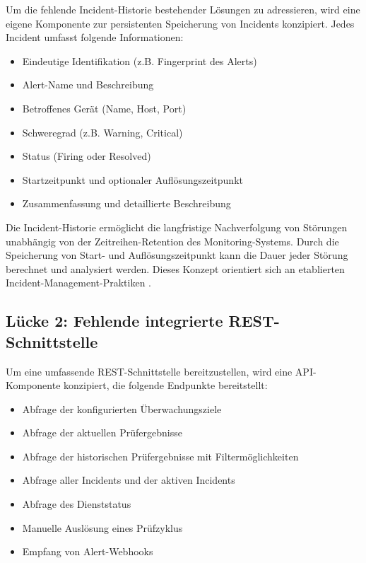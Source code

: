 Um die fehlende Incident-Historie bestehender Lösungen zu adressieren, wird eine eigene Komponente zur persistenten Speicherung von Incidents konzipiert. Jedes Incident umfasst folgende Informationen:

\begin{itemize}
    \item Eindeutige Identifikation (z.B. Fingerprint des Alerts)
    \item Alert-Name und Beschreibung
    \item Betroffenes Gerät (Name, Host, Port)
    \item Schweregrad (z.B. Warning, Critical)
    \item Status (Firing oder Resolved)
    \item Startzeitpunkt und optionaler Auflösungszeitpunkt
    \item Zusammenfassung und detaillierte Beschreibung
\end{itemize}

Die Incident-Historie ermöglicht die langfristige Nachverfolgung von Störungen unabhängig von der Zeitreihen-Retention des Monitoring-Systems. Durch die Speicherung von Start- und Auflösungszeitpunkt kann die Dauer jeder Störung berechnet und analysiert werden. Dieses Konzept orientiert sich an etablierten Incident-Management-Praktiken \cite{incident-management-itil}.

\subsection{Lücke 2: Fehlende integrierte REST-Schnittstelle}
\label{subsec:loesung-luecke-2}

Um eine umfassende REST-Schnittstelle bereitzustellen, wird eine API-Komponente konzipiert, die folgende Endpunkte bereitstellt:

\begin{itemize}
    \item Abfrage der konfigurierten Überwachungsziele
    \item Abfrage der aktuellen Prüfergebnisse
    \item Abfrage der historischen Prüfergebnisse mit Filtermöglichkeiten
    \item Abfrage aller Incidents und der aktiven Incidents
    \item Abfrage des Dienststatus
    \item Manuelle Auslösung eines Prüfzyklus
    \item Empfang von Alert-Webhooks
\end{itemize}

